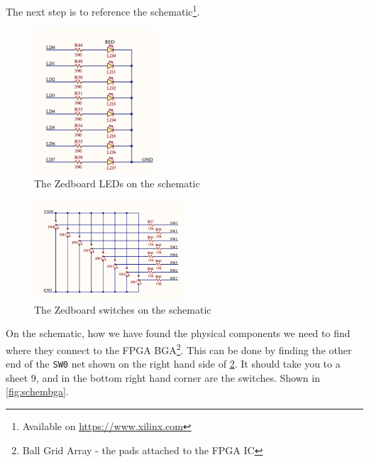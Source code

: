 {The next step is to reference the schematic\footnote{Available on \url{https://www.xilinx.com}}.


\begin{figure}[H]
    \begin{center}
        \includegraphics[width=0.4\textwidth]{./src/schem_led.png}
        \caption{The Zedboard LEDs  on the schematic}
        \label{fig:schemled}
    \end{center}
\end{figure}

\begin{figure}[H]
    \begin{center}
        \includegraphics[width=0.5\textwidth]{./src/schem_sw.png}
        \caption{The Zedboard switches  on the schematic}
        \label{fig:schemsw}
    \end{center}
\end{figure}

On the schematic, how we have found the physical components we need to find where they connect to the FPGA BGA\footnote{Ball Grid Array - the pads attached to the FPGA IC}. This can be done by finding the other end of the \texttt{SW0} net shown on the right hand side of \cref{fig:schemsw}. It should take you to a sheet 9, and in the bottom right hand corner are the switches. Shown in \cref{fig:schembga}.


}
